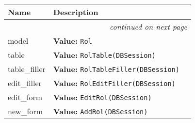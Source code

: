     \vspace{-1cm}
\hspace{\varindent}\begin{longtable}{|p{\varnamewidth}|p{\vardescrwidth}|l}
\cline{1-2}
\cline{1-2} \centering \textbf{Name} & \centering \textbf{Description}& \\
\cline{1-2}
\endhead\cline{1-2}\multicolumn{3}{r}{\small\textit{continued on next page}}\\\endfoot\cline{1-2}
\endlastfoot\raggedright m\-o\-d\-e\-l\- & \raggedright \textbf{Value:} 
{\tt Rol}&\\
\cline{1-2}
\raggedright t\-a\-b\-l\-e\- & \raggedright \textbf{Value:} 
{\tt RolTable(DBSession)}&\\
\cline{1-2}
\raggedright t\-a\-b\-l\-e\-\_\-f\-i\-l\-l\-e\-r\- & \raggedright \textbf{Value:} 
{\tt RolTableFiller(DBSession)}&\\
\cline{1-2}
\raggedright e\-d\-i\-t\-\_\-f\-i\-l\-l\-e\-r\- & \raggedright \textbf{Value:} 
{\tt RolEditFiller(DBSession)}&\\
\cline{1-2}
\raggedright e\-d\-i\-t\-\_\-f\-o\-r\-m\- & \raggedright \textbf{Value:} 
{\tt EditRol(DBSession)}&\\
\cline{1-2}
\raggedright n\-e\-w\-\_\-f\-o\-r\-m\- & \raggedright \textbf{Value:} 
{\tt AddRol(DBSession)}&\\
\cline{1-2}
\end{longtable}

